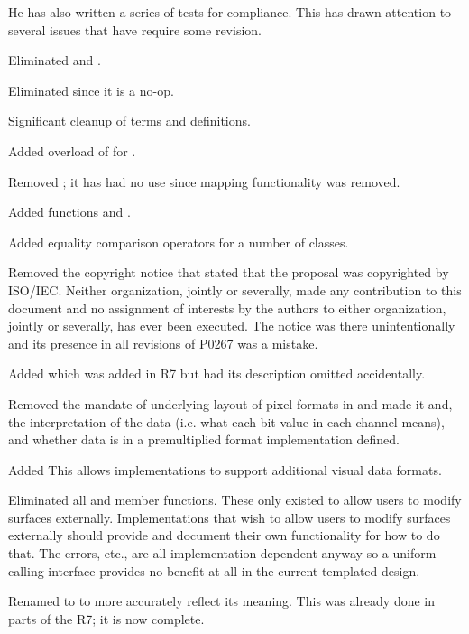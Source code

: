 \pnum
He has also written a series of tests for compliance. This has drawn attention to several issues that have require some revision.

\pnum
Eliminated  and .

\pnum
Eliminated  since it is a no-op.

\pnum
Significant cleanup of terms and definitions.

\pnum
Added overload of  for .

\pnum
Removed ; it has had no use since mapping functionality was removed.

\pnum
Added functions  and .

\pnum
Added equality comparison operators for a number of classes.

\pnum
Removed the copyright notice that stated that the proposal was copyrighted by ISO/IEC. Neither organization, jointly or severally, made any contribution to this document and no assignment of interests by the authors to either organization, jointly or severally, has ever been executed. The notice was there unintentionally and its presence in all revisions of P0267 was a mistake.

\pnum
Added  which was added in R7 but had its description omitted accidentally.

\pnum
Removed the mandate of underlying layout of pixel formats in  and made it and, the interpretation of the data (i.e. what each bit value in each channel means), and whether data is in a premultiplied format implementation defined.

\pnum
Added  This allows implementations to support additional visual data formats.

\pnum
Eliminated all  and  member functions. These only existed to allow users to modify surfaces externally. Implementations that wish to allow users to modify surfaces externally should provide and document their own functionality for how to do that. The errors, etc., are all implementation dependent anyway so a uniform calling interface provides no benefit at all in the current templated-design.

\pnum
Renamed  to  to more accurately reflect its meaning. This was already done in parts of the R7; it is now complete.

